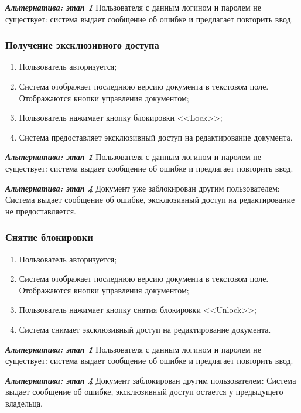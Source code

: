 	\textbf{\textit{Альтернатива: этап 1}} Пользователя с данным логином и паролем не существует: система выдает сообщение об ошибке и предлагает повторить ввод.
	
	\subsubsection{Получение эксклюзивного доступа}
	\begin{enumerate}
		\item Пользователь авторизуется;
		\item Система отображает последнюю версию документа в текстовом поле. Отображаются кнопки управления документом;
		\item Пользователь нажимает кнопку блокировки <<Lock>>;
		\item Система предоставляет эксклюзивный доступ на редактирование документа.
	\end{enumerate}
	
	\textbf{\textit{Альтернатива: этап 1}} Пользователя с данным логином и паролем не существует: система выдает сообщение об ошибке и предлагает повторить ввод.
	
	\textbf{\textit{Альтернатива: этап 4}} Документ уже заблокирован другим пользователем: Система выдает сообщение об ошибке, эксклюзивный доступ на редактирование не предоставляется.
	
	\subsubsection{Снятие блокировки}
	\begin{enumerate}
		\item Пользователь авторизуется;
		\item Система отображает последнюю версию документа в текстовом поле. Отображаются кнопки управления документом;
		\item Пользователь нажимает кнопку снятия блокировки <<Unlock>>;
		\item Система снимает эксклюзивный доступ на редактирование документа.
	\end{enumerate}
	
	\textbf{\textit{Альтернатива: этап 1}} Пользователя с данным логином и паролем не существует: система выдает сообщение об ошибке и предлагает повторить ввод.
	
	\textbf{\textit{Альтернатива: этап 4}} Документ заблокирован другим пользователем: Система выдает сообщение об ошибке, эксклюзивный доступ остается у предыдущего владельца.
	

